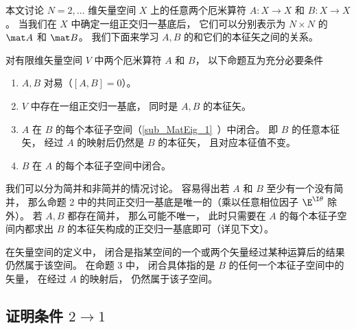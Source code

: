 

本文讨论 $N = 2, \dots$ 维矢量空间 $X$ 上的任意两个厄米算符 $A: X \to X$ 和 $B: X \to X$。 当我们在 $X$ 中确定一组正交归一基底后， 它们可以分别表示为 $N \times N$ 的 $\mat A$ 和 $\mat B$。 我们下面来学习 $A, B$ 的和它们的本征矢之间的关系。

\begin{theorem}{}\label{the_Commut_1}
对有限维矢量空间 $V$ 中两个厄米算符 $A$ 和 $B$， 以下命题互为充分必要条件
\begin{enumerate}
\item $A,B$ 对易（$[A,B] = 0$）。
\item $V$ 中存在一组正交归一基底， 同时是 $A, B$ 的本征矢。
\item $A$ 在 $B$ 的每个本征子空间（\autoref{sub_MatEig_1}~）中闭合。 即 $B$ 的任意本征矢， 经过 $A$ 的映射后仍然是 $B$ 的本征矢， 且对应本征值不变。
\item $B$ 在 $A$ 的每个本征子空间中闭合。
\end{enumerate}
\end{theorem}

我们可以分为简并和非简并的情况讨论。 容易得出若 $A$ 和 $B$ 至少有一个没有简并， 那么命题 2 中的共同正交归一基底是唯一的（乘以任意相位因子 $\E^{\I\theta}$ 除外）。 若 $A,B$ 都存在简并， 那么可能不唯一， 此时只需要在 $A$ 的每个本征子空间内都求出 $B$ 的本征矢构成的正交归一基底即可（详见下文）。

在矢量空间的定义中， 闭合是指某空间的一个或两个矢量经过某种运算后的结果仍然属于该空间。 在命题 3 中， 闭合具体指的是 $B$ 的任何一个本征子空间中的矢量， 在经过 $A$ 的映射后， 仍然属于该子空间。

\subsection{证明条件 $2 \to 1$}

